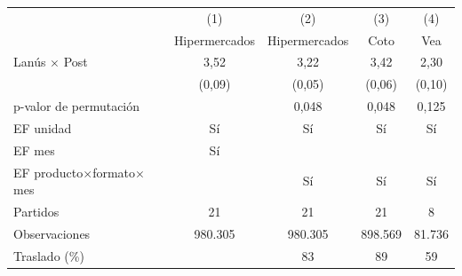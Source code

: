 \begin{tabular}{lcccc}
\toprule
 & (1) & (2) & (3) & (4) \\
 & Hipermercados & Hipermercados & Coto & Vea \\
\midrule
Lanús $\times$ Post & 3,52 & 3,22 & 3,42 & 2,30 \\
 & (0,09) & (0,05) & (0,06) & (0,10) \\
p-valor de permutación & & 0,048 & 0,048 & 0,125 \\
\midrule
EF unidad & Sí & Sí & Sí & Sí \\
EF mes & Sí & & & \\
EF producto$\times$formato$\times$mes & & Sí & Sí & Sí \\
Partidos & 21 & 21 & 21 & 8 \\
Observaciones & 980.305 & 980.305 & 898.569 & 81.736 \\
Traslado (\%) & & 83 & 89 & 59 \\
\bottomrule
\end{tabular}
